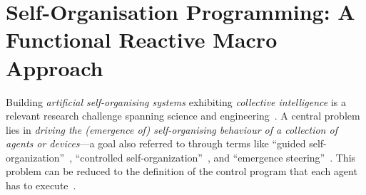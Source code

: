 

\theoremstyle{definition}
\newtheorem{example}{Example}
    
\newtheorem{theorem}{Theorem}
\chapter[Self-Organisation Programming]{
Self-Organisation Programming: A Functional Reactive Macro Approach
}\label{chap:eng:frp} %
\minitoc%

Building \emph{artificial self-organising systems} 
 exhibiting \emph{collective intelligence}
 is a relevant research challenge 
 spanning science and engineering~\cite{DBLP:journals/ker/ParunakB15,gershenson2007design-sos,DBLP:conf/uksim/SinghSP13,DBLP:journals/sttt/NicolaJW20}.
%
A central problem lies in \emph{driving the (emergence of) self-organising behaviour
of a collection of agents or devices}---a goal also referred to through terms like
``guided self-organization''~\cite{prokopenko2009guided-selforg},
``controlled self-organization''~\cite{DBLP:journals/taas/SchmeckMCMR10}, and
``emergence steering''~\cite{Varenne2015morpho,DBLP:conf/sysose/Giammarco17a}.
%
This problem can be reduced to the definition of the control program
 that each agent has to execute~\cite{DBLP:journals/tib/MartiusH12}.
%
%

